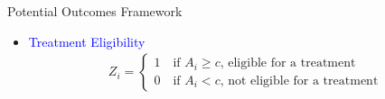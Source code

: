 \documentclass[dvipsnames,hyperref={pdfpagelabels=false}]{beamer}
\begin{document}
\begin{frame}{Potential Outcomes Framework}
	\begin{itemize}
		
		\item \textcolor{blue}{Treatment Eligibility}
		\begin{align*}
			Z_{i}=\left\lbrace
			\begin{array}{l}
				1\quad \text{if $A_i\geq c$, eligible for a treatment}\\
				0\quad \text{if $A_i< c$, not eligible for a treatment}
			\end{array}\right.
		\end{align*}
		
	\end{itemize}
\end{frame}
\end{document}
